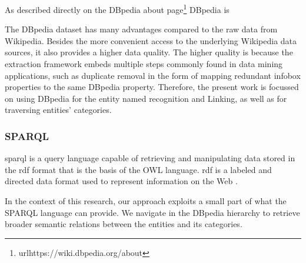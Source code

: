 As described directly on the DBpedia about page\footnote{url{https://wiki.dbpedia.org/about}} DBpedia is 

\begin{displayquote}
\end{displayquote}


The DBpedia dataset has many advantages compared to the raw data from Wikipedia. Besides the more convenient access to the underlying Wikipedia data sources, it also provides a higher data quality. The higher quality is because the extraction framework embeds multiple steps commonly found in data mining applications, such as duplicate removal in the form of mapping redundant infobox properties to the same DBpedia property.
Therefore, the present work is focussed on using DBpedia for the entity named recognition and Linking, as well as for traversing entities' categories.


\subsubsection{\hspace*{3pt} SPARQL}

\gls{sparql} is a query language capable of retrieving and manipulating data stored in the \gls{rdf} format that is the basis of the OWL language. \gls{rdf} is a labeled and directed data format used to represent information on the Web \cite{prud2008sparql}. 

In the context of this research, our approach exploits a small part of what the SPARQL language can provide. We  navigate in the DBpedia hierarchy to retrieve broader semantic relations between the entities and its categories. 
